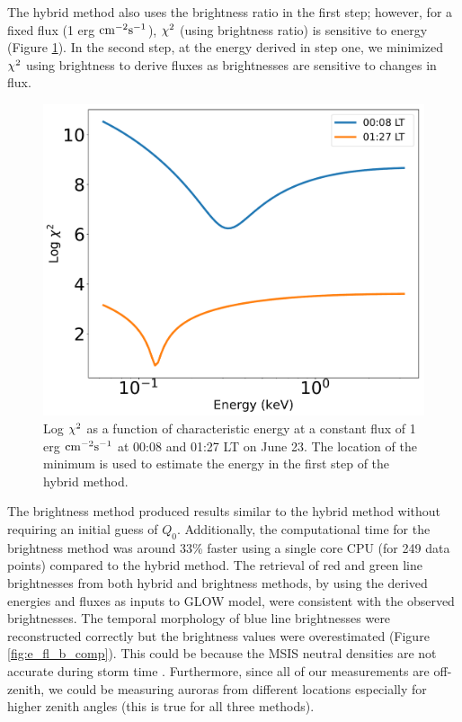\documentclass[crop=false,class=mitthesis,oneside,font=12pt]{standalone}
\begin{document}
The hybrid method also uses the brightness ratio in the first step; however, for a fixed flux (1 erg $\rm cm^{-2}s^{-1}$), $\rm \chi^2$ (using brightness ratio) is sensitive to energy (Figure \ref{fig:chi_hybrid}). In the second step, at the energy derived in step one, we minimized $\rm \chi^2$ using brightness to derive fluxes as brightnesses are sensitive to changes in flux.
\begin{figure}[H]
	\centering\includegraphics[width=32pc]{different_fl_evschi2.pdf}
	\caption{Log $\rm \chi^2$ as a function of characteristic energy at a constant flux of 1 erg $\rm cm^{-2} s^{-1}$ at 00:08 and 01:27 LT on June 23. The location of the minimum is used to estimate the energy in the first step of the hybrid method.}
	\label{fig:chi_hybrid}
\end{figure}

The brightness method produced results similar to the hybrid method without requiring an initial guess of $Q_0$. Additionally, the computational time for the brightness method was around 33\% faster using a single core CPU (for 249 data points) compared to the hybrid method. The retrieval of red and green line brightnesses from both hybrid and brightness methods, by using the derived energies and fluxes as inputs to GLOW model, were consistent with the observed brightnesses. The temporal morphology of blue line brightnesses were reconstructed correctly but the brightness values were overestimated (Figure \ref{fig:e_fl_b_comp}). This could be because the MSIS neutral densities are not accurate during storm time \citep{fang_variations_2012}. Furthermore, since all of our measurements are off-zenith, we could be measuring auroras from different locations especially for higher zenith angles (this is true for all three methods).
\end{document}
